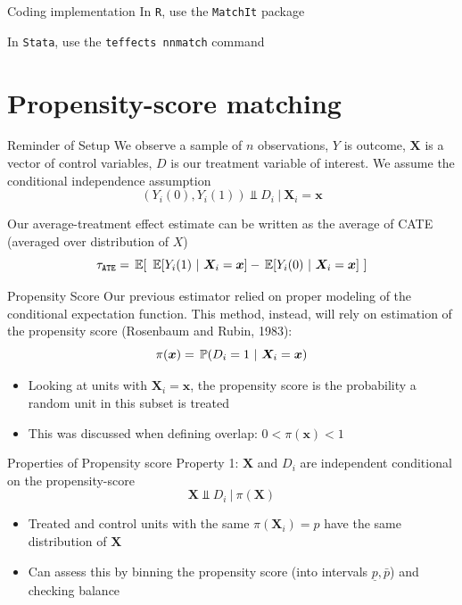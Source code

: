 \documentclass[aspectratio=169,t,11pt,table]{beamer}
\begin{document}
\begin{frame}{Coding implementation}
  In \texttt{R}, use the \texttt{MatchIt} package

  \bigskip
  In \texttt{Stata}, use the \texttt{teffects nnmatch} command 
\end{frame}

\section{Propensity-score matching}

\begin{frame}{Reminder of Setup}
  We observe a sample of $n$ observations, $Y$ is outcome, $\bm{X}$ is a vector of control variables, $D$ is our treatment variable of interest. We assume the conditional independence assumption
  $$
    (Y_{i}(0), Y_{i}(1)) \Perp D_i \ \vert \ \bm{X}_i = \bm{x}
  $$

  \pause
  \bigskip
  Our average-treatment effect estimate can be written as the average of CATE (averaged over distribution of $X$)
  $$
    \tau_{\texttt{ATE}} = \expec{\ \expec{Y_i(1)}{\bm{X}_i = \bm{x}} - \expec{Y_i(0)}{\bm{X}_i = \bm{x}} \ }
  $$
\end{frame}

\begin{frame}{Propensity Score}
  Our previous estimator relied on proper modeling of the conditional expectation function. This method, instead, will rely on estimation of the \alert{propensity score} (Rosenbaum and Rubin, 1983):
  $$
    \pi(\bm{x}) = \prob{D_i = 1}{\bm{X}_i = \bm{x}}
  $$
  \begin{itemize}
    \item Looking at units with $\bm{X}_i = \bm{x}$, the propensity score is the probability a random unit in this subset is treated
    \item This was discussed when defining \alert{overlap}: $0 < \pi(\bm{x}) < 1$
  \end{itemize}
\end{frame}

\begin{frame}{Properties of Propensity score}
  Property 1: $\bm{X}$ and $D_i$ are independent conditional on the propensity-score 
  $$
    \bm{X} \Perp D_i \ \vert \ \pi(\bm{X})
  $$
  \begin{itemize}
    \item Treated and control units with the same $\pi(\bm{X}_i) = p$ have the same distribution of $\bm{X}$ 
    \item Can assess this by binning the propensity score (into intervals $\underline{p}, \bar{p}$) and checking balance 
  \end{itemize}
\end{frame}
\end{document}
